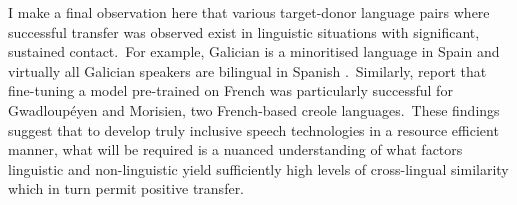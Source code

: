 \documentclass[main.tex]{subfiles}
\begin{document}
I make a final observation here that various target-donor language pairs where successful transfer was observed exist in linguistic situations with significant, sustained contact.~For example, Galician is a minoritised language in Spain and virtually all Galician speakers are bilingual in Spanish \parencite{de2020phonetic}.~Similarly, \textcite{macaire-etal-2022-automatic} report that fine-tuning a model pre-trained on French was particularly successful for Gwadloupéyen and Morisien, two French-based creole languages.~These findings suggest that to develop truly inclusive speech technologies in a resource efficient manner, what will be required is a nuanced understanding of what factors linguistic and non-linguistic yield sufficiently high levels of cross-lingual similarity which in turn permit positive transfer.
\end{document}

